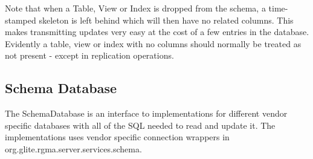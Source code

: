 Note that when a Table, View or Index is dropped from the schema, a
time-stamped skeleton is left behind which will then have no related
columns. This makes transmitting updates very easy at the cost of a
few entries in the database. Evidently a table, view or index with no
columns should normally be treated as not present - except in
replication operations.

\subsection{Schema Database}

The SchemaDatabase is an interface to implementations for different
vendor specific databases with all of the SQL needed to read and
update it. The implementations uses vendor specific connection
wrappers in org.glite.rgma.server.services.schema. 


